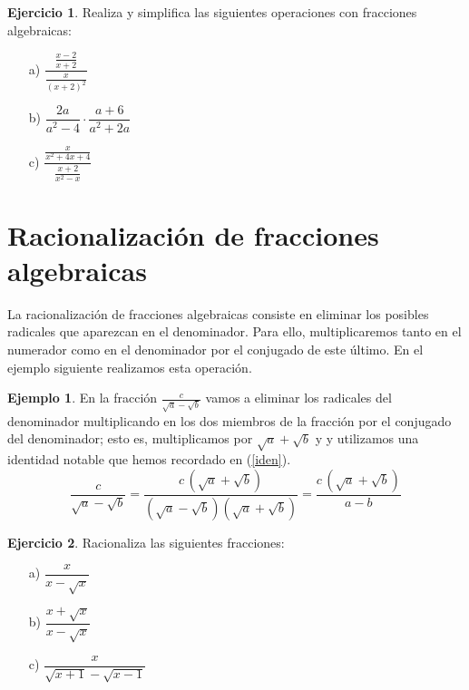 \documentclass[13pt]{scrartcl}
\theoremstyle{definition}
\newtheorem{ejemplo}{Ejemplo}
\newtheorem{ejercicio}{Ejercicio}
\begin{document}
\begin{ejercicio} Realiza y simplifica las siguientes operaciones con fracciones algebraicas:
\begin{multicols}{3}
\begin{enumerate}
\item[a)]$\dfrac{\frac{x-2}{x+2}}{ \frac{x}{(x+2)^2}}$
\item[b)]$\dfrac{2a}{a^2-4} \cdot \dfrac{a+6}{a^2+2a}$
\item[c)]$\dfrac{\frac{x}{x^2+4x+4} }{ \frac{x+2}{x^2-x}}$
\end{enumerate}
\end{multicols}
\end{ejercicio}

\section{Racionalización de fracciones algebraicas}
La racionalización de fracciones algebraicas consiste en eliminar los posibles radicales que aparezcan en el denominador. Para ello, multiplicaremos tanto en el numerador como en el denominador por el conjugado de este último. En el ejemplo siguiente realizamos esta operación.

\begin{ejemplo} En la fracción $\frac{c}{\sqrt{a}-\sqrt{b}}$ vamos a eliminar los radicales del denominador multiplicando en los dos miembros de la fracción por el conjugado del denominador; esto es, multiplicamos por $\sqrt{a}+\sqrt{b}$ y y utilizamos una identidad notable que hemos recordado en (\ref{iden}).
\[
\frac{c}{\sqrt{a}-\sqrt{b}} =\frac{c\, (\sqrt{a}+\sqrt{b})}{(\sqrt{a}-\sqrt{b})(\sqrt{a}+\sqrt{b})} 
 = \frac{c\, (\sqrt{a}+\sqrt{b})}{a-b} 
\]
\end{ejemplo}

\begin{ejercicio} Racionaliza las siguientes fracciones:
\begin{multicols}{3}
\begin{enumerate}
\item[a)]$\dfrac{x}{x-\sqrt{x}}$
\item[b)]$\dfrac{x+\sqrt{x}}{x-\sqrt{x}}$
\item[c)]$\dfrac{x}{\sqrt{x+1}-\sqrt{x-1}}$
\end{enumerate}
\end{multicols}
\end{ejercicio}
\end{document}
